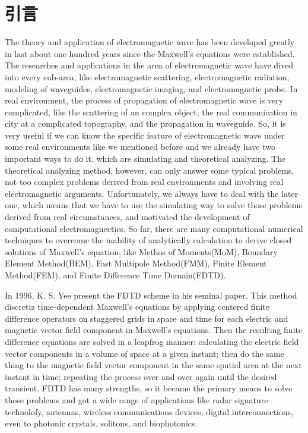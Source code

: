 
\chapter{引言}

The theory and application of electromagnetic wave has been developed greatly in last about one hundred years since the Maxwell's equations were established. The researches and applications in the area of electromagnetic wave have dived into every sub-area,  like electromagnetic scattering, electromagnetic radiation, modeling of waveguides, electromagnetic imaging, and electromagnetic probe. In real environment, the process of propagation of electromagnetic wave is very complicated, like the scattering of an complex object, the real communication in city at a complicated topography, and the propagation in waveguide. So, it is very useful if we can know the specific feature of electromagnetic wave under some real environments like we mentioned before and we already have two important ways to do it, which are simulating and theoretical analyzing. The theoretical analyzing method, however, can only answer some typical problems, not too complex problems derived from real environments and involving real electromagnetic arguments. Unfortunately, we always have to deal with the later one, which means that we have to use the simulating way to solve those problems derived from real circumstances, and motivated the development of computational electromagnectics. So far, there are many computational numerical techniques to overcome the inability of analytically calculation to derive closed solutions of Maxwell's equation, like Methos of Moments(MoM), Boundary Element Method(BEM), Fast Multipole Method(FMM), Finite Element Method(FEM), and Finite Difference Time Domain(FDTD).

In 1996, K. S. Yee \cite{Yee} present the FDTD scheme in his seminal paper. This method discretiz time-dependent Maxwell's equations by applying centered finite difference operators on staggered grids in space and time for each electric and magnetic vector field component in Maxwell's equations. Then the resulting finite difference equations are solved in a leapfrog manner: calculating the electric field vector components in a volume of space at a given instant; then do the same thing to the magnetic field vector component in the same spatial area at the next instant in time; repeating the process over and over again until the desired transient. FDTD has many strengths, so it became the primary means to solve those problems and got a wide range of applications like radar signature technolofy, antennas, wireless communications devices, digital interconnections, even to photonic crystals, solitons, and biophotonics.

